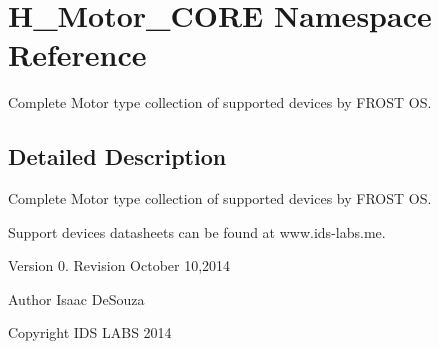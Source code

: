 \hypertarget{namespaceH__Motor__CORE}{}\section{H\+\_\+\+Motor\+\_\+\+C\+O\+R\+E Namespace Reference}
\label{namespaceH__Motor__CORE}


Complete Motor type collection of supported devices by F\+R\+O\+S\+T O\+S.  




\subsection{Detailed Description}
Complete Motor type collection of supported devices by F\+R\+O\+S\+T O\+S. 

Support devices datasheets can be found at www.\+ids-\/labs.\+me.

Version 0. Revision October 10,2014

\begin{DoxyAuthor}{Author}
Isaac De\+Souza 
\end{DoxyAuthor}
\begin{DoxyCopyright}{Copyright}
I\+D\+S L\+A\+B\+S 2014 
\end{DoxyCopyright}
